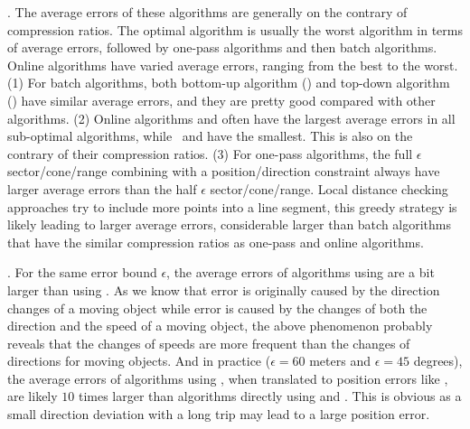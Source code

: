 {. The average errors of these algorithms  are generally on the contrary of compression ratios. The optimal algorithm is usually  the worst algorithm in terms of average errors, followed by one-pass algorithms and then batch algorithms.
Online algorithms have varied average errors, ranging from the best to the worst.
(1) For batch algorithms, both bottom-up algorithm (\tpa) and top-down algorithm (\dpa) have similar average errors, and they are pretty good compared with other algorithms.
%
(2) Online algorithms \bqsa and \opwa often have the largest average errors in all sub-optimal algorithms, while \myblue{\dagots}~and \squishe have the smallest. This is also on the contrary of their compression ratios.
%
(3) For one-pass algorithms, the full $\epsilon$ sector/cone/range combining with a position/direction constraint always have larger average errors than the half $\epsilon$ sector/cone/range.
%
Local distance checking approaches try to include more points into a line segment, this greedy strategy is likely leading to larger average errors, considerable larger than batch algorithms that have the similar compression ratios as one-pass and online algorithms.


.
For the same error bound $\epsilon$, the average errors of algorithms using \sed are a bit larger than using \ped. {As we know that \ped error is originally caused by the direction changes of a moving object while \sed error is caused by the changes of both the direction and the speed of a moving object, the above phenomenon probably reveals that the changes of speeds are more frequent than the changes of directions for moving objects.}
%
And in practice (\eg $\epsilon = 60$ meters and $\epsilon = 45$ degrees), the average errors of algorithms using \dad, when translated to position errors like \ped, are likely $10$ times larger than algorithms directly using \ped and \sed. This is obvious as a small direction deviation with a long trip may lead to a large position error.










}
